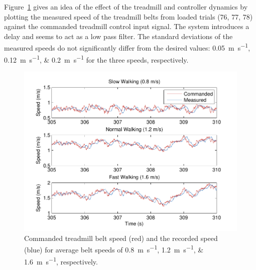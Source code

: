 \documentclass[fleqn,12pt]{wlpeerj}
\begin{document}
Figure~\ref{fig:input_output} gives an idea of the effect of the treadmill and
controller dynamics by plotting the measured speed of the treadmill belts from
loaded trials (76, 77, 78) against the commanded treadmill control input
signal. The system introduces a delay and seems to act as a low pass filter.
The standard deviations of the measured speeds do not significantly differ from
the desired values: \SIlist{0.05;0.12;0.2}{\meter\per\second} for the three
speeds, respectively.
%
\begin{figure}
  \centering
  \includegraphics{figures/input_vs_output.pdf}
  \caption{Commanded treadmill belt speed (red) and the recorded
    speed (blue) for average belt speeds of
    \SIlist{0.8;1.2;1.6}{\meter\per\second}, respectively.}
  \label{fig:input_output}
\end{figure}
\end{document}
